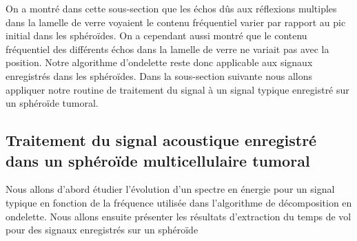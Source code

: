 On a  montré dans cette sous-section que les échos dûs aux réflexions multiples dans la lamelle de verre voyaient le contenu fréquentiel varier par rapport au pic initial dans les sphéroïdes. On a cependant aussi montré que le contenu fréquentiel des différents échos dans la lamelle de verre ne variait pas avec la position. Notre algorithme d'ondelette reste donc applicable aux signaux enregistrés dans les sphéroïdes. Dans la sous-section suivante nous allons appliquer notre routine  de traitement du signal à un signal typique enregistré sur un sphéroïde tumoral.


\subsection{Traitement du signal acoustique enregistré dans un sphéroïde multicellulaire tumoral} 
Nous allons d'abord étudier l'évolution d'un spectre en énergie pour un signal typique en fonction de la fréquence utilisée dans l'algorithme de décomposition en ondelette. Nous allons ensuite présenter les résultats d'extraction du temps de vol pour des signaux enregistrés sur un sphéroïde

